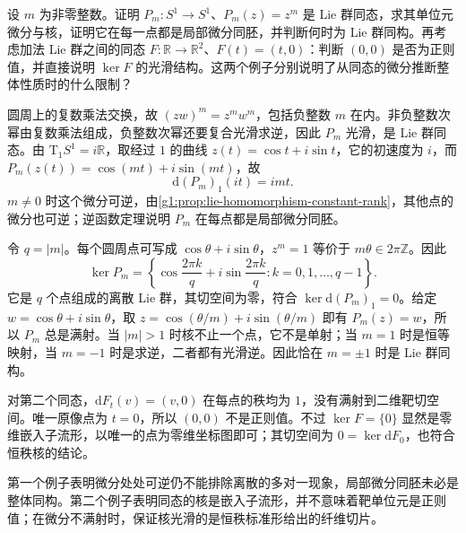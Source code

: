 \begin{exercise}\label{g1:ex:circle-power-homomorphism-kernel}
	设 \(m\) 为非零整数。证明 \(P_m:S^1\to S^1\)、\(P_m(z)=z^m\) 是 Lie 群同态，求其单位元微分与核，证明它在每一点都是局部微分同胚，并判断何时为 Lie 群同构。再考虑加法 Lie 群之间的同态 \(F:\mathbb R\to\mathbb R^2\)、\(F(t)=(t,0)\)：判断 \((0,0)\) 是否为正则值，并直接说明 \(\ker F\) 的光滑结构。这两个例子分别说明了从同态的微分推断整体性质时的什么限制？
\end{exercise}
\begin{solution}
	圆周上的复数乘法交换，故 \((zw)^m=z^mw^m\)，包括负整数 \(m\) 在内。非负整数次幂由复数乘法组成，负整数次幂还要复合光滑求逆，因此 \(P_m\) 光滑，是 Lie 群同态。由 \(\mathrm{T}_1S^1=i\mathbb R\)，取经过 \(1\) 的曲线 \(z(t)=\cos t+i\sin t\)，它的初速度为 \(i\)，而 \(P_m(z(t))=\cos(mt)+i\sin(mt)\)，故
	\[
		\mathrm{d}(P_m)_1(it)=imt.
	\]
	\(m\neq0\) 时这个微分可逆，由\cref{g1:prop:lie-homomorphism-constant-rank}，其他点的微分也可逆；逆函数定理说明 \(P_m\) 在每点都是局部微分同胚。

	令 \(q=|m|\)。每个圆周点可写成 \(\cos\theta+i\sin\theta\)，\(z^m=1\) 等价于 \(m\theta\in2\pi\mathbb Z\)。因此
	\[
		\ker P_m=\left\{\cos\frac{2\pi k}{q}+i\sin\frac{2\pi k}{q}:k=0,1,\ldots,q-1\right\}.
	\]
	它是 \(q\) 个点组成的离散 Lie 群，其切空间为零，符合 \(\ker\mathrm{d}(P_m)_1=0\)。给定 \(w=\cos\theta+i\sin\theta\)，取 \(z=\cos(\theta/m)+i\sin(\theta/m)\) 即有 \(P_m(z)=w\)，所以 \(P_m\) 总是满射。当 \(|m|>1\) 时核不止一个点，它不是单射；当 \(m=1\) 时是恒等映射，当 \(m=-1\) 时是求逆，二者都有光滑逆。因此恰在 \(m=\pm1\) 时是 Lie 群同构。

	对第二个同态，\(\mathrm{d}F_t(v)=(v,0)\) 在每点的秩均为 \(1\)，没有满射到二维靶切空间。唯一原像点为 \(t=0\)，所以 \((0,0)\) 不是正则值。不过 \(\ker F=\{0\}\) 显然是零维嵌入子流形，以唯一的点为零维坐标图即可；其切空间为 \(0=\ker\mathrm{d}F_0\)，也符合恒秩核的结论。

	第一个例子表明微分处处可逆仍不能排除离散的多对一现象，局部微分同胚未必是整体同构。第二个例子表明同态的核是嵌入子流形，并不意味着靶单位元是正则值；在微分不满射时，保证核光滑的是恒秩标准形给出的纤维切片。
\end{solution}

